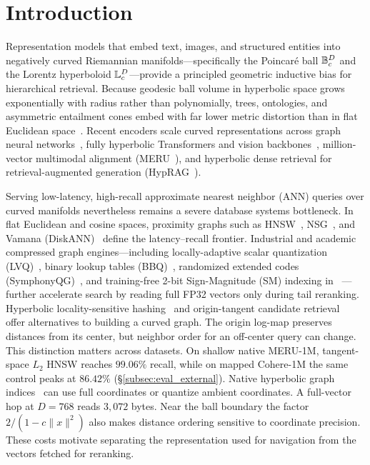 \section{Introduction}
\label{sec:intro}

Representation models that embed text, images, and structured entities into negatively curved {Riemannian} manifolds---specifically the {Poincar\'e} ball $\mathbb{B}_c^D$ and the {Lorentz} hyperboloid $\mathbb{L}_c^D$---provide a principled geometric inductive bias for hierarchical retrieval.
Because geodesic ball volume in hyperbolic space grows exponentially with radius rather than polynomially, trees, ontologies, and asymmetric entailment cones embed with far lower metric distortion than in flat {Euclidean} space~\cite{nickel2017poincare,sala2018representation,ganea2018entailment,gu2019mixed}.
Recent encoders scale curved representations across graph neural networks~\cite{nickel2018lorentz,chami2019hgcn}, fully hyperbolic Transformers and vision backbones~\cite{chen2022fully,khrulkov2020hyperbolic,ermolov2022hyperbolic}, million-vector multimodal alignment ({MERU}~\cite{desai2023meru}), and hyperbolic dense retrieval for retrieval-augmented generation ({HypRAG}~\cite{madhu2026hyprag,lewis2020rag}).

Serving low-latency, high-recall approximate nearest neighbor ({ANN}) queries over curved manifolds nevertheless remains a severe database systems bottleneck.
In flat {Euclidean} and cosine spaces, proximity graphs such as {HNSW}~\cite{malkov2020hnsw}, {NSG}~\cite{fu2019nsg}, and {Vamana} ({DiskANN})~\cite{subramanya2019diskann,azizi2025graph} define the latency--recall frontier.
Industrial and academic compressed graph engines---including locally-adaptive scalar quantization ({LVQ})~\cite{aguerrebere2023similarity}, binary lookup tables ({BBQ})~\cite{trent2024bbq}, randomized extended codes ({SymphonyQG})~\cite{gou2025symphonyqg}, and training-free 2-bit Sign-Magnitude ({SM}) indexing in {\quiver}~\cite{xiao2026quiver}---further accelerate search by reading full FP32 vectors only during tail reranking.
Hyperbolic locality-sensitive hashing~\cite{deng2026hyperboliclsh} and origin-tangent candidate retrieval~\cite{deng2026hyem} offer alternatives to building a curved graph. The origin log-map preserves distances from its center, but neighbor order for an off-center query can change. This distinction matters across datasets. On shallow native {MERU-1M}, tangent-space $L_2$ HNSW reaches $99.06\%$ recall, while on mapped {Cohere-1M} the same control peaks at $86.42\%$ (\S\ref{subsec:eval_external}).
Native hyperbolic graph indices~\cite{boytsov2013engineering,prokhorenkova2022hyperbolic,glukhota2026hyperspacedb} can use full coordinates or quantize ambient coordinates. A full-vector hop at $D=768$ reads $3{,}072$ bytes. Near the ball boundary the factor $2/(1-c\|x\|^2)$ also makes distance ordering sensitive to coordinate precision. These costs motivate separating the representation used for navigation from the vectors fetched for reranking.

